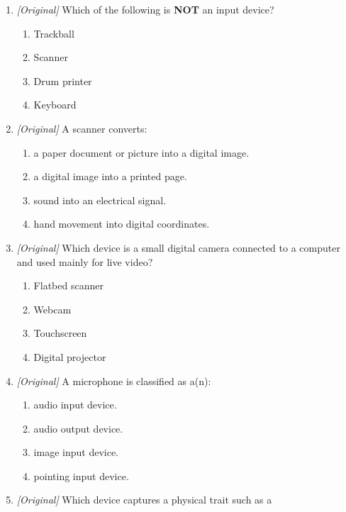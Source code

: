 \begin{enumerate}[label=\textbf{Q\arabic*.}, leftmargin=*]
\begin{enumerate}[label=\Alph*.]
    \item I-2, II-4, III-1, IV-3
    \item I-3, II-4, III-1, IV-2
    \item I-2, II-1, III-4, IV-3
    \item I-4, II-2, III-3, IV-1
  \end{enumerate}
\item \textit{[Original]} Which of the following is \textbf{NOT} an input
  device?
  \begin{enumerate}[label=\Alph*.]
    \item Trackball
    \item Scanner
    \item Drum printer
    \item Keyboard
  \end{enumerate}
\item \textit{[Original]} A scanner converts:
  \begin{enumerate}[label=\Alph*.]
    \item a paper document or picture into a digital image.
    \item a digital image into a printed page.
    \item sound into an electrical signal.
    \item hand movement into digital coordinates.
  \end{enumerate}
\item \textit{[Original]} Which device is a small digital camera connected to
  a computer and used mainly for live video?
  \begin{enumerate}[label=\Alph*.]
    \item Flatbed scanner
    \item Webcam
    \item Touchscreen
    \item Digital projector
  \end{enumerate}
\item \textit{[Original]} A microphone is classified as a(n):
  \begin{enumerate}[label=\Alph*.]
    \item audio input device.
    \item audio output device.
    \item image input device.
    \item pointing input device.
  \end{enumerate}
\item \textit{[Original]} Which device captures a physical trait such as a

\end{enumerate}

